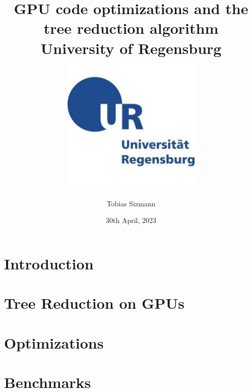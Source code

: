 \documentclass[12pt, twoside]{report}
\title{
    {GPU code optimizations and the tree reduction algorithm} \\
    {\large University of Regensburg} \\
    {\includegraphics[width = 0.5\textwidth]{ur_logo.jpg}}
}
\author{Tobias Sizmann}
\date{30th April, 2023}
\begin{document}
\maketitle

\tableofcontents

\chapter{Introduction}


\chapter{Tree Reduction on GPUs}


\chapter{Optimizations}


\chapter{Benchmarks}


\printbibliography
\end{document}
